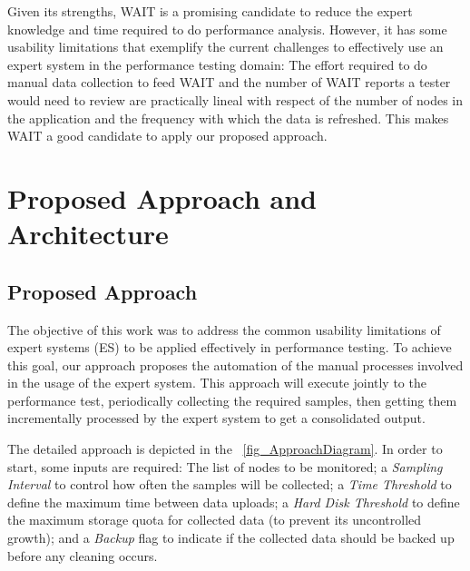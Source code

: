 \documentclass[runningheads,a4paper]{llncs}
\begin{document}
Given its strengths, WAIT is a promising candidate to reduce the expert
knowledge and time required to do performance analysis. However, it has
some usability limitations that exemplify the current challenges to effectively
use an expert system in the performance testing domain: The effort required to
do manual data collection to feed WAIT and the number of WAIT reports a tester
would need to review are practically lineal with respect of the number of nodes
in the application and the frequency with which the data is refreshed. This
makes WAIT a good candidate to apply our proposed approach.

\vspace{-5pt}
\section{Proposed Approach and Architecture}
\label{ProposedApproach}
\vspace{-5pt}


\subsection{Proposed Approach}
\vspace{-5pt}
The objective of this work was to address the common usability limitations of
expert systems (ES) to be applied effectively in performance testing. To achieve
this goal, our approach proposes the automation of the manual processes involved
in the usage of the expert system. This approach will execute jointly to the
performance test, periodically collecting the required samples, then getting
them incrementally processed by the expert system to get a consolidated output.

The detailed approach is depicted in the \figurename
~\ref{fig_ApproachDiagram}. In order to start, some inputs are
required: The list of nodes to be monitored; a \emph{Sampling Interval} to
control how often the samples will be collected; a \emph{Time Threshold} to
define the maximum time between data uploads; a \emph{Hard Disk Threshold} to
define the maximum storage quota for collected data (to prevent its uncontrolled
growth); and a \emph{Backup} flag to indicate if the collected data should be
backed up before any cleaning occurs.
\end{document}
